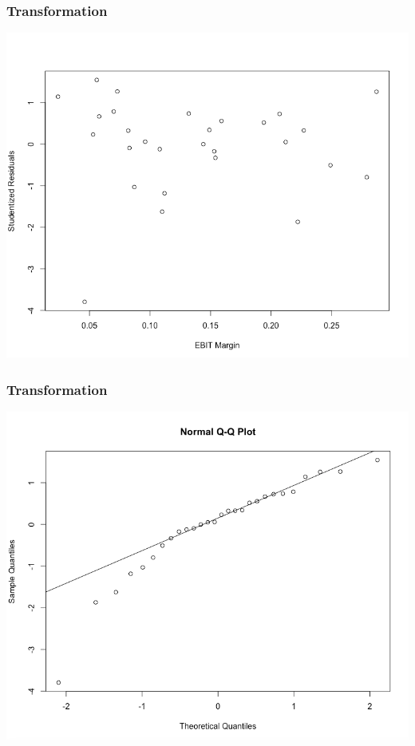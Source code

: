 \documentclass[12pt]{beamer}
\begin{document}
\begin{frame}
\frametitle{Transformation}
\begin{center}
\includegraphics[scale=0.3]{pic16.png}
\end{center}
\end{frame}

\begin{frame}
\frametitle{Transformation}
\begin{center}
\includegraphics[scale=0.3]{pic17.png}
\end{center}
\end{frame}
\end{document}
